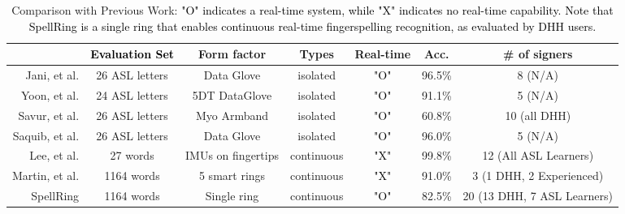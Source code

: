 \begin{table*}[t]
\caption{Comparison with Previous Work: \textcolor{black}{ "O" indicates a real-time system, while "X" indicates no real-time capability. Note that SpellRing is a single ring that enables continuous real-time fingerspelling recognition, as evaluated by DHH users.}}
\begin{tabular}{r|c|c|c|c|c|c}
\hline
     & \textbf{\textcolor{black}{Evaluation Set}} & \textbf{Form factor} & \textbf{Types} & \textbf{Real-time} & \textbf{Acc.} & \textbf{\# of signers}            \\ \hline
Jani, et al.    \cite{jani2018sensor} & 26 ASL letters   & Data Glove           & isolated       & \textcolor{black}{"O"}                 & 96.5\%       & 8 (N/A)                                    \\ \hline
Yoon, et al. \cite{yoon2012adaptive}   & 24 ASL letters   & 5DT DataGlove        & isolated       & \textcolor{black}{"O"}                       & 91.1\%       & 5 (N/A)                                    \\ \hline
  Savur, et al. \cite{savur2016american}  & 26 ASL letters   & Myo Armband          & isolated       & \textcolor{black}{"O"}                       & 60.8\%       & 10 (all DHH)                                   \\ \hline
 Saquib, et al. \cite{saquib2020application}   & 26 ASL letters   & Data Glove           & isolated       & \textcolor{black}{"O"}                      & 96.0\%         & 5 (N/A)                                \\ \hline
  Lee, et al. \cite{lee2020sensor}   & 27 words         & IMUs on fingertips   & continuous     & \textcolor{black}{"X"}                       & 99.8\%       & 12 (All ASL Learners)                   \\ \hline
  Martin, et al. \cite{martin2023fingerspeller}   & 1164 words       & 5 smart rings        & continuous     & \textcolor{black}{"X"}                   & 91.0\%         & 3 (1 DHH, 2 Experienced)    \\ \hline
SpellRing & 1164 words       & Single ring          & continuous     & \textcolor{black}{"O"}                      & 82.5\%       & 20 (13  DHH, 7 ASL Learners) \\ \hline
\end{tabular}
\end{table*}
\label{table:1}


